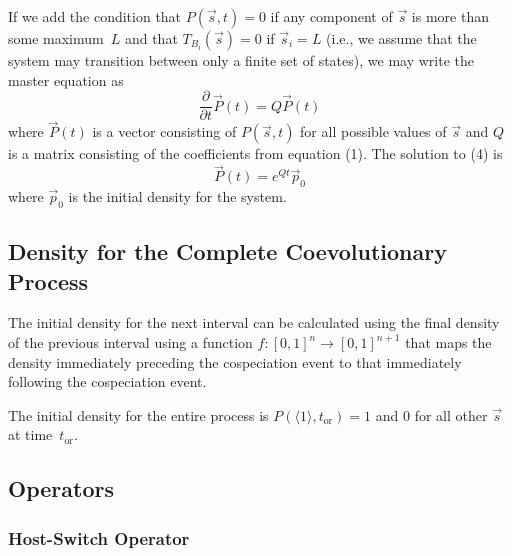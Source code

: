 \documentclass{article}
\begin{document}
            If we add the condition that $P\left(\vec{s},t\right) = 0$ if any
            component of $\vec{s}$ is more than some maximum~$L$ and that
            $T_{B_i}\left(\vec{s}\right) = 0$ if $\vec{s}_i = L$ (i.e., we
            assume that the system may transition between only a finite set of
            states), we may write the master equation as
            \begin{equation}
                \frac{\partial}{\partial t} \vec{P}\left(t\right) =
                Q\vec{P}\left(t\right)
            \end{equation}
            where $\vec{P}\left(t\right)$ is a vector consisting of
            $P\left(\vec{s}, t\right)$ for all possible values of $\vec{s}$ and
            $Q$ is a matrix consisting of the coefficients from equation (1).
            The solution to (4) is
            \begin{equation}
                \vec{P}\left(t\right) = e^{Qt}\vec{p}_0
            \end{equation}
            where $\vec{p}_0$ is the initial density for the system.

        \subsection*{Density for the Complete Coevolutionary Process}

            The initial density for the next interval can be calculated using
            the final density of the previous interval using a function
            $f : [0,1]^n \to [0,1]^{n+1}$ that maps the density immediately
            preceding the cospeciation event to that immediately following the
            cospeciation event.

            The initial density for the entire process is
            $P\left(\langle1\rangle, t_\text{or}\right) = 1$ and 0 for all
            other $\vec{s}$ at time~$t_\text{or}$.

        \subsection*{Operators}

            \subsubsection*{Host-Switch Operator}
\end{document}
